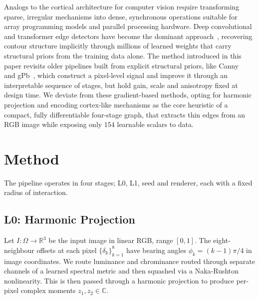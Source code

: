 \documentclass[11pt,a4paper]{article}
\newcommand{\R}{\mathbb{R}}
\begin{document}
Analogs to the cortical architecture for computer vision require transforming sparse, irregular mechanisms into dense, synchronous operations suitable for array programming models and parallel processing hardware. Deep convolutional and transformer edge detectors have become the dominant approach~\cite{xie2015hed,liu2017rcf,he2019bdcn,pu2022edter,soria2023dexined,ye2024diffusionedge}, recovering contour structure implicitly through millions of learned weights that carry structural priors from the training data alone. The method introduced in this paper revisits older pipelines built from explicit structural priors, like Canny~\cite{canny1986computational} and gPb~\cite{arbelaez2011gpb}, which construct a pixel-level signal and improve it through an interpretable sequence of stages, but hold gain, scale and anisotropy fixed at design time. We deviate from these gradient-based methods, opting for harmonic projection and encoding cortex-like mechanisms as the core heuristic of a compact, fully differentiable four-stage graph, that extracts thin edges from an RGB image while exposing only $154$ learnable scalars to data.

\section{Method}\label{sec:method}

The pipeline operates in four stages; L0, L1, seed and renderer, each with a fixed radius of interaction.

\subsection{L0: Harmonic Projection}\label{sec:l0}

Let $I:\Omega\to\R^3$ be the input image in linear RGB, range $[0,1]$. The eight-neighbour offsets at each pixel $\{\delta_k\}_{k=1}^{8}$ have bearing angles $\phi_k = (k-1)\pi/4$ in image coordinates.
We route luminance and chrominance routed through separate channels of a learned spectral metric and then squashed via a Naka-Rushton nonlinearity. This is then passed through a harmonic projection to produce per-pixel complex moments $z_1, z_2 \in \mathbb{C}$. 
\end{document}

